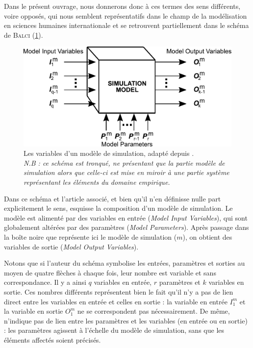 Dans le présent ouvrage, nous donnerons donc à ces termes des sens différents, voire opposés, qui nous semblent représentatifs dans le champ de la modélisation en sciences humaines internationale et se retrouvent partiellement dans le schéma de \textsc{Balci} (\cref{fig:parametres-Balci}).

\begin{figure}[H]
	\centering
	\includegraphics[width=.8\linewidth]{img/schema_parametres_balci.pdf}
	\caption[Les variables d'un modèle de simulation selon \citeauthor{balci_validation_1994}]{Les variables d'un modèle de simulation, adapté depuis \textcite[122]{balci_validation_1994}.\\
	\textit{N.B : ce schéma est tronqué, ne présentant que la partie \og modèle de simulation\fg{} alors que celle-ci est mise en miroir à une partie \og système\fg{} représentant les éléments du domaine empirique.}}
	\label{fig:parametres-Balci} 
\end{figure}

Dans ce schéma et l'article associé, et bien qu'il n'en définisse nulle part explicitement le sens, \citeauthor{balci_validation_1994} esquisse la composition d'un modèle de simulation.
Le modèle est alimenté par des variables en entrée (\textit{Model Input Variables}), qui sont globalement altérées par des paramètres (\textit{Model Parameters}).
Après passage dans la \og boîte noire\fg{} que représente ici le modèle de simulation ($m$), on obtient des variables de sortie (\textit{Model Output Variables}).

Notons que si l'auteur du schéma symbolise les entrées, paramètres et sorties au moyen de quatre flèches à chaque fois, leur nombre est variable et sans correspondance.
Il y a ainsi $q$ variables en entrée, $r$ paramètres et $k$ variables en sortie.
Ces nombres différents représentent bien le fait qu'il n'y a pas de lien direct entre les variables en entrée et celles en sortie : la variable en entrée $I_{1}^m$ et la variable en sortie $O_{1}^m$ ne se correspondent pas nécessairement.
De même, \citeauthor{balci_validation_1994} n'indique pas de lien entre les paramètres et les variables (en entrée ou en sortie) : les paramètres agissent à l'échelle du modèle de simulation, sans que les éléments affectés soient précisés.

